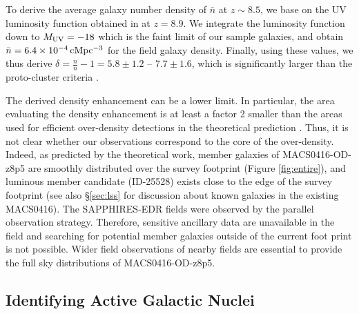 \documentclass[twocolumn]{aastex631}
\begin{document}
To derive the average galaxy number density of ${\bar n}$ at $z\sim8.5$, we base on the UV luminosity function obtained in \citet{Bouwens2021} at $z=8.9$. We integrate the luminosity function down to $M_{\rm UV}=-18$ which is the faint limit of our sample galaxies, and obtain ${\bar n} = 6.4 \times 10^{-4}\,{\rm cMpc^{-3}}$ for the field galaxy density. Finally, using these values, we thus derive $\delta = \frac{n}{{\bar n}} - 1 =5.8\pm1.2$ -- $7.7\pm1.6$, which is significantly larger than the proto-cluster criteria \citep[e.g.,][]{Chiang2013}.  

The derived density enhancement can be a lower limit. In particular, the area evaluating the density enhancement is at least a factor 2 smaller than the areas used for efficient over-density detections in the theoretical prediction \citep{Chiang2013}. Thus, it is not clear whether our observations correspond to the core of the over-density.
Indeed, as predicted by the theoretical work, member galaxies of MACS0416-OD-z8p5 are smoothly distributed over the survey footprint (Figure \ref{fig:entire}), and luminous member candidate (ID-25528) exists close to the edge of the survey footprint (see also \S\ref{sec:lss} for discussion about known galaxies in the existing MACS0416). The SAPPHIRES-EDR fields were observed by the parallel observation strategy. Therefore, sensitive ancillary data are unavailable in the field and searching for potential member galaxies outside of the current foot print is not possible. Wider field observations of nearby fields are essential to provide the full sky distributions of MACS0416-OD-z8p5.


\subsection{Identifying Active Galactic Nuclei}
\label{sec:AGN}
\end{document}
